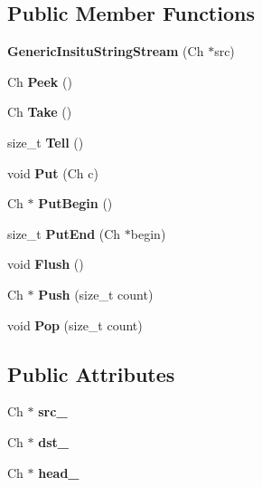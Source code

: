 \subsection*{Public Member Functions}
\begin{DoxyCompactItemize}
\item 
\mbox{\label{a02204_ad8b8417f0501ac261c7232023292c183}} 
{\bfseries Generic\+Insitu\+String\+Stream} (Ch $\ast$src)
\item 
\mbox{\label{a02204_ae21ba3ff4595ccd5caa4a9858e793f3f}} 
Ch {\bfseries Peek} ()
\item 
\mbox{\label{a02204_afde4e46663225e4c32cfdbcd261f321e}} 
Ch {\bfseries Take} ()
\item 
\mbox{\label{a02204_aa9a84abb24e8c93b683a2e7bfea309db}} 
size\+\_\+t {\bfseries Tell} ()
\item 
\mbox{\label{a02204_a74f92f9a4c34bd65aab4b99f519a543a}} 
void {\bfseries Put} (Ch c)
\item 
\mbox{\label{a02204_afc671072f56eb6e8d9009061c6565dd4}} 
Ch $\ast$ {\bfseries Put\+Begin} ()
\item 
\mbox{\label{a02204_a93702b08ff29c66bde389b0d4e9efa5a}} 
size\+\_\+t {\bfseries Put\+End} (Ch $\ast$begin)
\item 
\mbox{\label{a02204_a53597dc98a03a6a051c37c4f1046bd04}} 
void {\bfseries Flush} ()
\item 
\mbox{\label{a02204_af91a643e5a93292bc0fbda33320caf20}} 
Ch $\ast$ {\bfseries Push} (size\+\_\+t count)
\item 
\mbox{\label{a02204_ad2c56d9dd64268ad72aab95f981fd761}} 
void {\bfseries Pop} (size\+\_\+t count)
\end{DoxyCompactItemize}
\subsection*{Public Attributes}
\begin{DoxyCompactItemize}
\item 
\mbox{\label{a02204_af3cc551dd07fcca39db84459f4d4e718}} 
Ch $\ast$ {\bfseries src\+\_\+}
\item 
\mbox{\label{a02204_ab0e7a73638a7a8db81aa9b26714b0e3b}} 
Ch $\ast$ {\bfseries dst\+\_\+}
\item 
\mbox{\label{a02204_af5a7116bdd9bfde5141c298a5b7566b0}} 
Ch $\ast$ {\bfseries head\+\_\+}
\end{DoxyCompactItemize}


